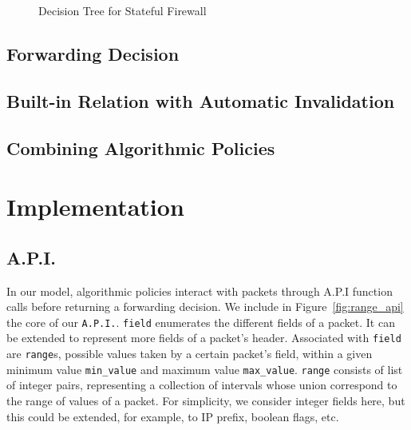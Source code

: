 \documentclass[preprint]{sigplanconf}
\begin{document}
  \begin{figure}

\caption{Decision Tree for Stateful Firewall}     
\label{fig:decisiontree}  
  \end{figure}
   

   

   \subsection*{Forwarding Decision}

   
   \subsection*{Built-in Relation with Automatic Invalidation}


   


   \subsection*{Combining Algorithmic Policies}
   
\section*{Implementation}

\subsection*{A.P.I.}
In our model, algorithmic policies interact with packets through A.P.I function calls before returning a forwarding decision. We include in Figure~\ref{fig:range_api} the core of our \lstinline|A.P.I.|. 
\lstinline|field| enumerates the different fields of a packet. It can be extended to represent more fields of a packet's header. Associated with \lstinline|field| are \lstinline|range|s, possible values taken by a certain packet's field, within a given minimum value \lstinline|min_value| and maximum value \lstinline|max_value|. \lstinline|range| consists of list of integer pairs, representing a collection of intervals whose union correspond to the range of values of a packet. For simplicity, we consider integer fields here, but this could be extended, for example, to IP prefix, boolean flags, etc.
\end{document}
